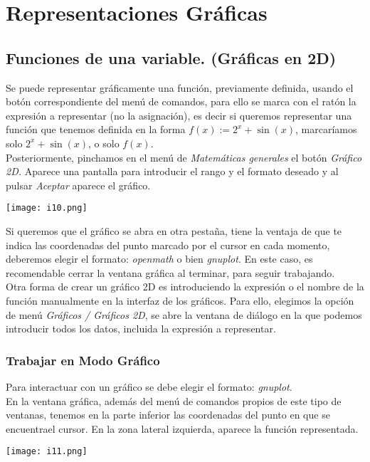 \documentclass[12pt]{article}
\begin{document}
\section*{Representaciones Gráficas}
\subsection*{Funciones de una variable. (Gráficas en 2D)}
Se puede representar gráficamente una función, previamente definida, usando el botón
correspondiente del menú de comandos, para ello se marca con el ratón la expresión a
representar (no la asignación), es decir si queremos representar una función que tenemos
definida en la forma $f(x):= 2^x + \sin(x)$, marcaríamos solo $2^x + \sin(x)$, o solo $f(x)$.\\

Posteriormente, pinchamos en el menú de \textit{Matemáticas generales}  el botón \textit{Gráfico 2D.} Aparece una pantalla para  introducir  el rango y el formato deseado  y al pulsar \textit{Aceptar} aparece el gráfico.

\begin{center}
   \texttt{[image: i10.png]}\\
\end{center}

Si queremos que el gráfico se  abra en otra pestaña, tiene la ventaja de que te indica las coordenadas del punto marcado por el cursor  en cada momento, deberemos elegir el
formato: \textit{openmath} o bien \textit{gnuplot}. En este caso, es recomendable cerrar la ventana gráfica al terminar, para seguir trabajando. \\

Otra forma de crear un gráfico 2D es introduciendo la expresión o el nombre de la función manualmente en la interfaz de los gráficos. Para ello, elegimos la opción de menú \textit{Gráficos / Gráficos 2D}, se abre la ventana de diálogo en la que podemos introducir todos los datos, incluida la expresión a representar.

\subsubsection*{Trabajar en Modo Gráfico}
Para interactuar con un gráfico se debe elegir el formato: \textit{gnuplot}.\\

En la ventana gráfica, además del menú de comandos propios de este tipo de ventanas,
tenemos en la parte inferior las coordenadas del punto en que se encuentrael cursor. En la zona lateral izquierda, aparece la función representada.
\begin{center}
   \texttt{[image: i11.png]}\\
\end{center}
\end{document}
